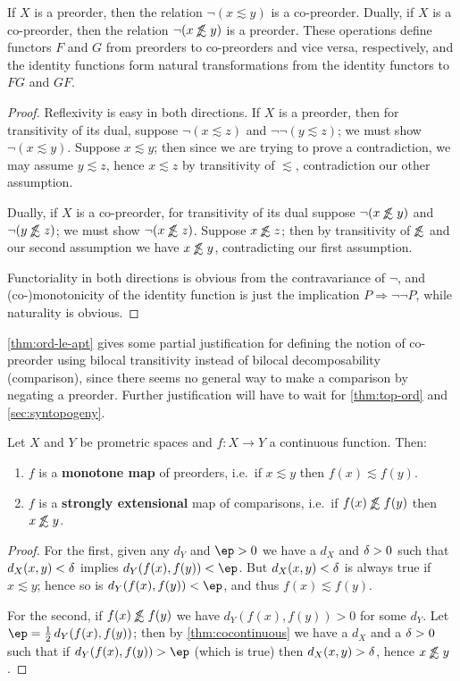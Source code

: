 \documentclass{article}
\def\oapt{\mathrel{\!\not\,\not\lesssim}}
\def\leapx{\lesssim}
\let\implies\Rightarrow
\begin{document}
\begin{thm}\label{thm:ord-le-apt}
  If $X$ is a preorder, then the relation $\neg(x\leapx y)$ is a co-preorder.
  Dually, if $X$ is a co-preorder, then the relation $\neg(x\oapt y)$ is a preorder.
  These operations define functors $F$ and $G$ from preorders to co-preorders and vice versa, respectively, and the identity functions form natural transformations from the identity functors to $F G$ and $G F$.
\end{thm}
\begin{proof}
  Reflexivity is easy in both directions.
  If $X$ is a preorder, then for transitivity of its dual, suppose $\neg(x\leapx z)$ and $\neg\neg(y\leapx z)$; we must show $\neg(x\leapx y)$.
  Suppose $x\leapx y$; then since we are trying to prove a contradiction, we may assume $y\leapx z$, hence $x\leapx z$ by transitivity of $\leapx$, contradiction our other assumption.

  Dually, if $X$ is a co-preorder, for transitivity of its dual suppose $\neg (x\oapt y)$ and $\neg (y\oapt z)$; we must show $\neg(x\oapt z)$.
  Suppose $x\oapt z$; then by transitivity of $\oapt$ and our second assumption we have $x\oapt y$, contradicting our first assumption.

  Functoriality in both directions is obvious from the contravariance of $\neg$, and (co-)monotonicity of the identity function is just the implication $P\implies \neg\neg P$, while naturality is obvious.
\end{proof}

\cref{thm:ord-le-apt} gives some partial justification for defining the notion of co-preorder using bilocal transitivity instead of bilocal decomposability (comparison), since there seems no general way to make a comparison by negating a preorder.
Further justification will have to wait for \cref{thm:top-ord} and \cref{sec:syntopogeny}.

\begin{thm}\label{thm:pmet-monotone}
  Let $X$ and $Y$ be prometric spaces and $f:X\to Y$ a continuous function.
  Then:
  \begin{enumerate}
  \item $f$ is a \textbf{monotone map} of preorders, i.e.\ if $x\leapx y$ then $f(x)\leapx f(y)$.
  \item $f$ is a \textbf{strongly extensional} map of comparisons, i.e.\ if $f(x)\oapt f(y)$ then $x\oapt y$.
  \end{enumerate}
\end{thm}
\begin{proof}
  For the first, given any $d_Y$ and $\ep>0$ we have a $d_X$ and $\delta>0$ such that $d_X(x,y)<\delta$ implies $d_Y(f(x),f(y))<\ep$.
  But $d_X(x,y)<\delta$ is always true if $x\leapx y$; hence so is $d_Y(f(x),f(y))<\ep$, and thus $f(x)\leapx f(y)$.

  For the second, if $f(x)\oapt f(y)$ we have $d_Y(f(x),f(y))>0$ for some $d_Y$.
  Let $\ep = \frac12 \,d_Y(f(x),f(y))$; then by \cref{thm:cocontinuous} we have a $d_X$ and a $\delta>0$ such that if $d_Y(f(x),f(y))>\ep$ (which is true) then $d_X(x,y)>\delta$, hence $x\oapt y$.
\end{proof}
\end{document}
